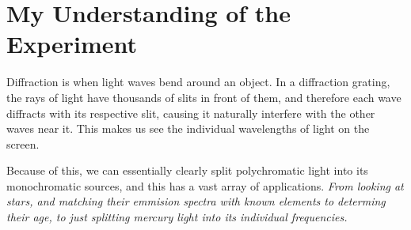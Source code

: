 \documentclass[11pt]{article}
\begin{document}
	\section{My Understanding of the Experiment}
	Diffraction is when light waves bend around an object. In a diffraction grating, the rays of light have thousands of slits in front of them, and therefore each wave diffracts with its respective slit, causing it naturally interfere with the other waves near it. This makes us see the individual wavelengths of light on the screen.  
	
	Because of this, we can essentially clearly split polychromatic light into its monochromatic sources, and this has a vast array of applications. \textit{From looking at stars, and matching their emmision spectra with known elements to determing their age, to just splitting mercury light into its individual frequencies. }
\end{document}
